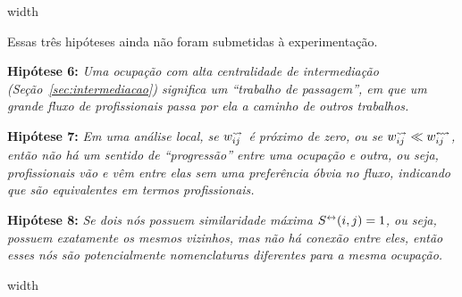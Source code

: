 \documentclass[10pt,a4paper,final]{article}
\newcommand\disappearingrule{%
  \par %
  \vskip10pt %
  \leaders\vrule width \textwidth\vskip0.4pt %
  \nointerlineskip %
  \vskip10pt %
}
\begin{document}
\disappearingrule

\begin{minipage}[t][18\baselineskip]{\linewidth}
  \begin{wrapfigure}{l}{0.5\textwidth}
  \end{wrapfigure}
  
  Essas três hipóteses ainda não foram submetidas à experimentação.
  
  \textbf{Hipótese 6:} \textit{Uma ocupação com alta centralidade de intermediação (Seção~\ref{sec:intermediacao}) significa um \enquote{trabalho de passagem}, em que um grande fluxo de profissionais passa por ela a caminho de outros trabalhos.}
  
  \textbf{Hipótese 7:} \textit{Em uma análise local, se $w^\leadsto_{ij}$ é próximo de zero, ou se $w^\leadsto_{ij} \ll w^\leftrightsquigarrow_{ij}$, então não há um sentido de \enquote{progressão} entre uma ocupação e outra, ou seja, profissionais vão e vêm entre elas sem uma preferência óbvia no fluxo, indicando que são equivalentes em termos profissionais.}
  
  \textbf{Hipótese 8:} \textit{Se dois nós possuem similaridade máxima $S^\leftrightarrow(i,j) = 1$, ou seja, possuem exatamente os mesmos vizinhos, mas não há conexão entre eles, então esses nós são potencialmente nomenclaturas diferentes para a mesma ocupação.}
\end{minipage}

\disappearingrule
\end{document}
